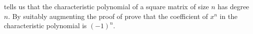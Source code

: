  tells us that the characteristic polynomial of a square matrix of size $n$ has degree $n$.  By suitably augmenting the proof of  prove that the coefficient of $x^n$ in the characteristic polynomial is $(-1)^n$.